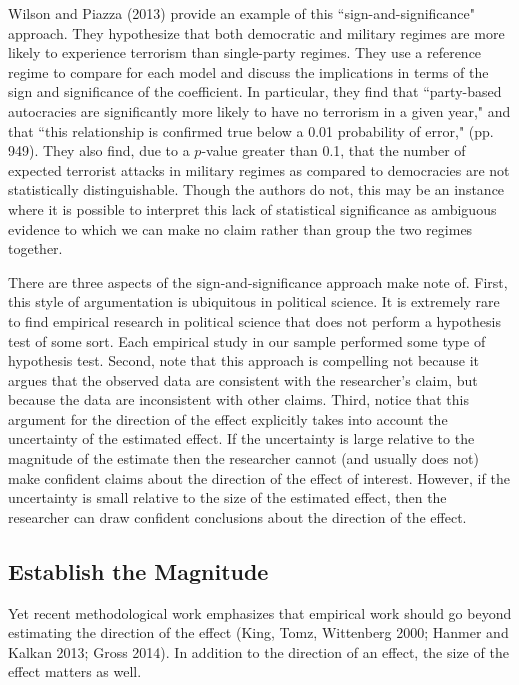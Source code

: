 \documentclass[12pt]{article}
\begin{document}
Wilson and Piazza (2013) provide an example of this ``sign-and-significance" approach. They hypothesize that both democratic and military regimes are more likely to experience terrorism than single-party regimes. They use a reference regime to compare for each model and discuss the implications in terms of the sign and significance of the coefficient. In particular, they find that ``party-based autocracies are significantly more likely to have no terrorism in a given year," and that ``this relationship is confirmed true below a 0.01 probability of error," (pp. 949). They also find, due to a $p$-value greater than 0.1, that the number of expected terrorist attacks in military regimes as compared to democracies are not statistically distinguishable. Though the authors do not, this may be an instance where it is possible to interpret this lack of statistical significance as ambiguous evidence to which we can make no claim rather than group the two regimes together. 

There are three aspects of the sign-and-significance approach make note of. First, this style of argumentation is ubiquitous in political science. It is extremely rare to find empirical research in political science that does not perform a hypothesis test of some sort. Each empirical study in our sample performed some type of hypothesis test. Second, note that this approach is compelling not because it argues that the observed data are consistent with the researcher's claim, but because the data are inconsistent with other claims. Third, notice that this argument for the direction of the effect explicitly takes into account the uncertainty of the estimated effect. If the uncertainty is large relative to the magnitude of the estimate then the researcher cannot (and usually does not) make confident claims about the direction of the effect of interest. However, if the uncertainty is small relative to the size of the estimated effect, then the researcher can draw confident conclusions about the direction of the effect. 

\subsection*{Establish the Magnitude}

Yet recent methodological work emphasizes that empirical work should go beyond estimating the direction of the effect (King, Tomz, Wittenberg 2000; Hanmer and Kalkan 2013; Gross 2014). In addition to the direction of an effect, the size of the effect matters as well. 
\end{document}
